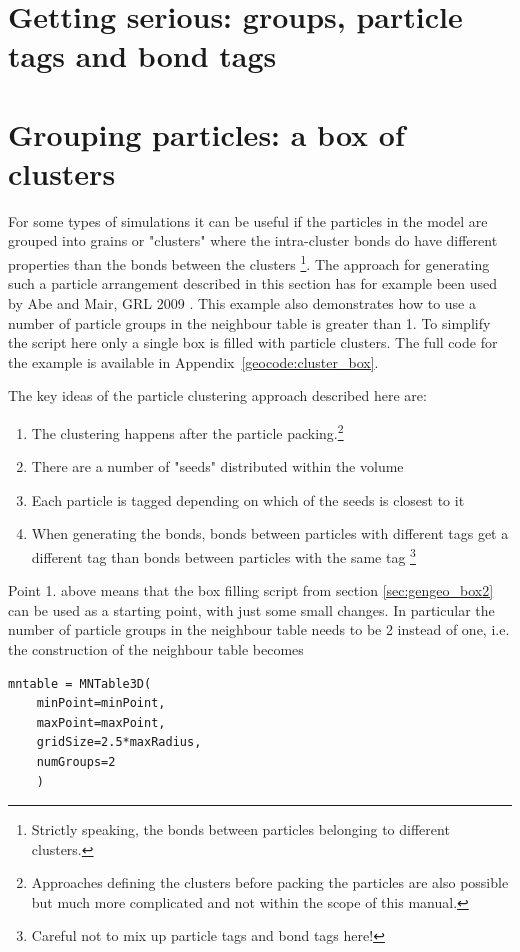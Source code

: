 \section{Getting serious: groups, particle tags and bond tags}

\section{Grouping particles: a box of clusters}
\label{sec:gengeo_clusterbox}

For some types of simulations it can be useful if the particles in the model are grouped into grains or "clusters" where the intra-cluster bonds do have different properties than the bonds between the clusters \footnote{Strictly speaking, the bonds between particles belonging to different clusters.}. The approach for generating such a particle arrangement described in this section has for example been used by Abe and Mair, GRL 2009 \cite{Abe_Mair_GRL_2009}. This example also demonstrates how to use a number of particle groups in the neighbour table is greater than 1. To simplify the script here only a single box is filled with particle clusters. The full code for the example is available in Appendix~\ref{geocode:cluster_box}. \par
The key ideas of the particle clustering approach described here are:
\begin{enumerate}
\item The clustering happens after the particle packing.\footnote{Approaches defining the clusters before packing the particles are also possible but much more complicated and not within the scope of this manual.}
\item There are a number of "seeds" distributed within the volume
\item Each particle is tagged depending on which of the seeds is closest to it
\item When generating the bonds, bonds between particles with different tags get a different tag than bonds between particles with the same tag \footnote{Careful not to mix up particle tags and bond tags here!}
\end{enumerate} 
Point 1. above means that the box filling script from section \ref{sec:gengeo_box2} can be used as a starting point, with just some small changes. In particular the number of particle groups in the neighbour table needs to be 2 instead of one, i.e. the construction of the neighbour table becomes
\begin{verbatim}
mntable = MNTable3D(
    minPoint=minPoint,
    maxPoint=maxPoint,
    gridSize=2.5*maxRadius,
    numGroups=2
    )
\end{verbatim}
